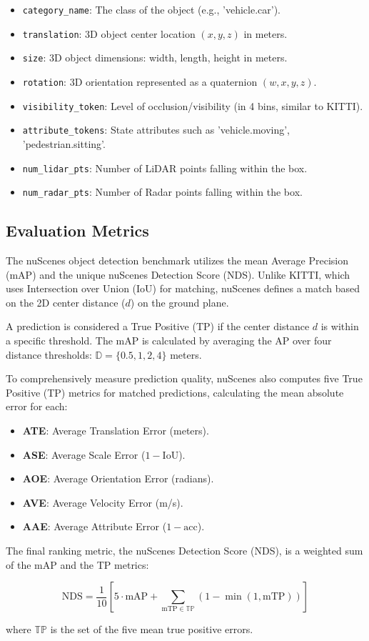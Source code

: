 \begin{itemize}
    \item \texttt{category\_name}: The class of the object (e.g., 'vehicle.car').
    \item \texttt{translation}: 3D object center location $(x, y, z)$ in meters.
    \item \texttt{size}: 3D object dimensions: width, length, height in meters.
    \item \texttt{rotation}: 3D orientation represented as a quaternion $(w, x, y, z)$.
    \item \texttt{visibility\_token}: Level of occlusion/visibility (in 4 bins, similar to KITTI).
    \item \texttt{attribute\_tokens}: State attributes such as 'vehicle.moving', 'pedestrian.sitting'.
    \item \texttt{num\_lidar\_pts}: Number of LiDAR points falling within the box.
    \item \texttt{num\_radar\_pts}: Number of Radar points falling within the box.
\end{itemize}

\subsection{Evaluation Metrics}
The nuScenes object detection benchmark utilizes the mean Average Precision (mAP) and the unique nuScenes Detection Score (NDS). Unlike KITTI, which uses Intersection over Union (IoU) for matching, nuScenes defines a match based on the 2D center distance ($d$) on the ground plane.

A prediction is considered a True Positive (TP) if the center distance $d$ is within a specific threshold. The mAP is calculated by averaging the AP over four distance thresholds: $\mathbb{D} = \{0.5, 1, 2, 4\}$ meters.

To comprehensively measure prediction quality, nuScenes also computes five True Positive (TP) metrics for matched predictions, calculating the mean absolute error for each:

\begin{itemize}
    \item \textbf{ATE}: Average Translation Error (meters).
    \item \textbf{ASE}: Average Scale Error ($1 - \text{IoU}$).
    \item \textbf{AOE}: Average Orientation Error (radians).
    \item \textbf{AVE}: Average Velocity Error (m/s).
    \item \textbf{AAE}: Average Attribute Error ($1 - \text{acc}$).
\end{itemize}

The final ranking metric, the nuScenes Detection Score (NDS), is a weighted sum of the mAP and the TP metrics:

\begin{equation}
    \text{NDS} = \frac{1}{10} \left[ 5 \cdot \text{mAP} + \sum_{\text{mTP} \in \mathbb{TP}} (1 - \min(1, \text{mTP})) \right]
\end{equation}

\noindent where $\mathbb{TP}$ is the set of the five mean true positive errors.